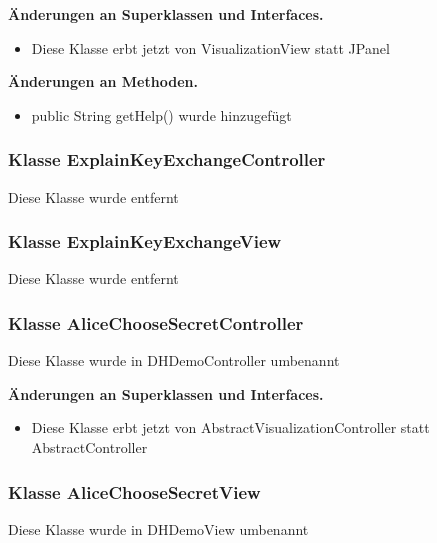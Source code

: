 \documentclass{article}
\begin{document}
	    \textbf{Änderungen an Superklassen und Interfaces.}\newline
	   \begin{itemize}
            \item Diese Klasse erbt jetzt von VisualizationView statt JPanel\newline
           \end{itemize}

    \textbf{Änderungen an Methoden.}\newline
	   \begin{itemize}
           \item public String getHelp() wurde hinzugefügt\newline
           \end{itemize}

	\subsubsection{Klasse ExplainKeyExchangeController}
    Diese Klasse wurde entfernt\newline

	\subsubsection{Klasse ExplainKeyExchangeView}
    Diese Klasse wurde entfernt\newline

	\subsubsection{Klasse AliceChooseSecretController}
    Diese Klasse wurde in DHDemoController umbenannt\newline

	    \textbf{Änderungen an Superklassen und Interfaces.}\newline
	   \begin{itemize}
            \item Diese Klasse erbt jetzt von AbstractVisualizationController statt AbstractController\newline
           \end{itemize}

	\subsubsection{Klasse AliceChooseSecretView}
    Diese Klasse wurde in DHDemoView umbenannt\newline
\end{document}
